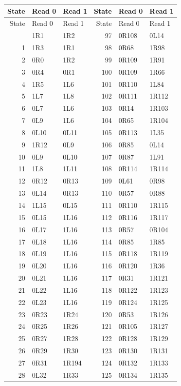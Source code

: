 \begin{longtable}{rll@{\hspace{10mm}}rll}
\toprule
State & Read 0 & Read 1 & State & Read 0 & Read 1\\
\midrule\endfirsthead
\toprule State & Read 0 & Read 1 & State & Read 0 & Read 1\\\midrule\endhead
\bottomrule\endfoot
0 & 1R1 & 1R2 & 97 & 0R108 & 0L14\\
1 & 1R3 & 1R1 & 98 & 0R68 & 1R98\\
2 & 0R0 & 1R2 & 99 & 0R109 & 1R91\\
3 & 0R4 & 0R1 & 100 & 0R109 & 1R66\\
4 & 1R5 & 1L6 & 101 & 0R110 & 1L84\\
5 & 1L7 & 1L8 & 102 & 0R111 & 1R112\\
6 & 0L7 & 1L6 & 103 & 0R14 & 1R103\\
7 & 0L9 & 1L6 & 104 & 0R65 & 1R104\\
8 & 0L10 & 0L11 & 105 & 0R113 & 1L35\\
9 & 1R12 & 0L9 & 106 & 0R85 & 0L14\\
10 & 0L9 & 0L10 & 107 & 0R87 & 1L91\\
11 & 1L8 & 1L11 & 108 & 0R114 & 1R114\\
12 & 0R12 & 0R13 & 109 & 0L61 & 0R98\\
13 & 0L14 & 0R13 & 110 & 0R57 & 0R88\\
14 & 1L15 & 0L15 & 111 & 0R110 & 1R115\\
15 & 0L15 & 1L16 & 112 & 0R116 & 1R117\\
16 & 0L17 & 1L16 & 113 & 0R57 & 0R104\\
17 & 0L18 & 1L16 & 114 & 0R85 & 1R85\\
18 & 0L19 & 1L16 & 115 & 0R118 & 1R119\\
19 & 0L20 & 1L16 & 116 & 0R120 & 1R36\\
20 & 0L21 & 1L16 & 117 & 0R31 & 1R121\\
21 & 0L22 & 1L16 & 118 & 0R122 & 1R123\\
22 & 0L23 & 1L16 & 119 & 0R124 & 1R125\\
23 & 0R23 & 1R24 & 120 & 0R53 & 1R126\\
24 & 0R25 & 1R26 & 121 & 0R105 & 1R127\\
25 & 0R27 & 1R28 & 122 & 0R128 & 1R129\\
26 & 0R29 & 1R30 & 123 & 0R130 & 1R131\\
27 & 0R31 & 1R194 & 124 & 0R132 & 1R133\\
28 & 0L32 & 1R33 & 125 & 0R134 & 1R135\\

\end{longtable}
